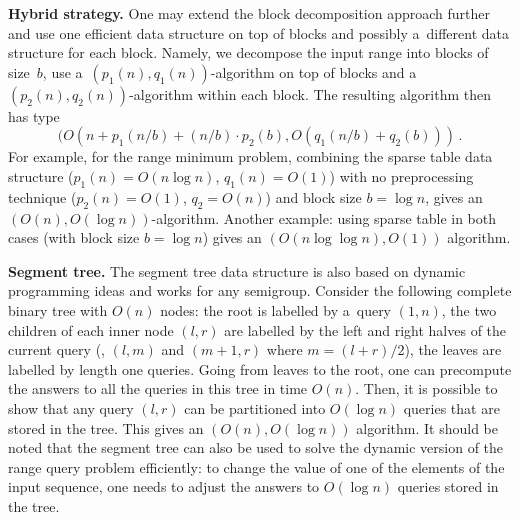 \documentclass{toc}
\begin{document}
\textbf{Hybrid strategy.} One may extend the block decomposition
approach further and use one efficient data structure on top of
blocks and possibly a~different data structure for each block.
Namely, we decompose the input range into blocks of size~$b$,
use a~$(p_1(n), q_1(n))$-algorithm on top of blocks and
a~$(p_2(n), q_2(n))$-algorithm within each block. The resulting algorithm then
has type
\[(O(n + p_1(n / b) + (n / b) \cdot p_2(b), O(q_1(n/b) + q_2(b))) \, .\]
For example, for the range minimum problem, combining the sparse table data
structure ($p_1(n)=O(n\log n)$, $q_1(n)=O(1)$) with no preprocessing technique
($p_2(n)=O(1)$, $q_2=O(n)$) and block size $b=\log n$, gives
an~$(O(n), O(\log n))$-algorithm. Another example: using sparse table in both
cases (with block size $b=\log n$) gives an $(O(n\log\log n), O(1))$ algorithm.


\textbf{Segment tree.} The segment tree data structure is also based on dynamic
programming ideas and works for any semigroup. Consider the following complete
binary tree with $O(n)$ nodes: the root is labelled by a~query $(1,n)$, the two
children of each inner node $(l,r)$ are labelled by the left and right halves of
the current query (\ie, $(l,m)$ and $(m+1,r)$ where $m=(l+r)/2$), the leaves
are labelled by length one queries. Going from leaves to the root, one can
precompute the answers to all the queries in this tree in time $O(n)$. Then, it
is possible to show that any query $(l,r)$ can be  partitioned into $O(\log n)$
queries that are stored in the tree. This gives an $(O(n), O(\log n))$
algorithm. It should be noted that the segment tree can also be used to solve
the dynamic version of the
range query
problem efficiently: to change the
value of one of the elements of the input sequence, one needs to adjust the
answers to $O(\log n)$ queries stored in the tree.
\end{document}
